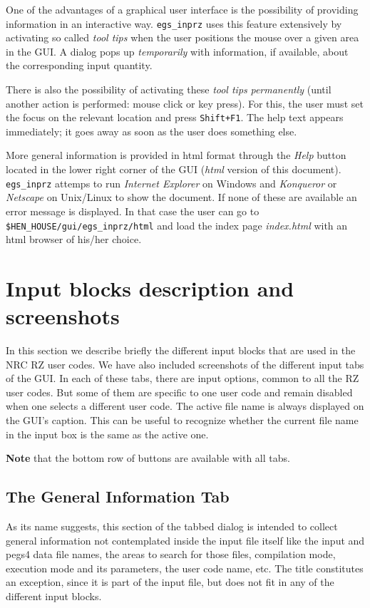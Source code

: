 \documentclass[12pt,twoside]{article}   %
\begin{document}
One of the advantages of a graphical user interface is the possibility of providing 
information in an interactive way. {\tt egs\_inprz} uses this feature extensively by 
activating so called {\em tool tips} when the user positions the mouse over a given area
in the GUI. A dialog pops up {\em temporarily} with information, if available, about the 
corresponding input quantity. 

There is also the possibility of activating these {\em tool tips} {\em permanently} (until 
another action is performed: mouse click or key press). For this, the user must set the focus 
on the relevant location and press {\tt Shift+F1}. The help text appears immediately; it goes 
away as soon as the user does something else.

More general information is provided in html format through the {\em Help} button located 
in the lower right corner of the GUI ({\em html} version of this document).
{\tt egs\_inprz} attemps to run {\em Internet Explorer} on Windows and
{\em Konqueror} or {\em Netscape} on Unix/Linux to show the document. If none of these 
are available an error message is displayed. In that case the user can go to {\tt \$HEN\_HOUSE/gui/egs\_inprz/html} and load the index page {\em index.html} with an html 
browser of his/her choice.

\section{Input blocks description and screenshots}
\label{screenshots}

In this section we describe briefly the different input blocks that are used in the NRC 
RZ user codes.
We have also included screenshots of the different input tabs of the GUI. In each 
of these tabs, there are input options, common to all the RZ user codes. But some of them are
specific to one user code and remain disabled when one selects a different user code.
The active file name is always displayed on the GUI's caption. This can be useful to recognize
whether the current file name in the input box is the same as the active one.

{\bf Note} that the bottom row of buttons are available with all tabs.


\newpage
\subsection{The General Information Tab}
\label{general}

As its name suggests, this section of the tabbed dialog is intended to collect general 
information not contemplated inside the input file itself like the input and pegs4 data 
file names, the areas to search for those files, compilation mode, execution mode and 
its parameters, 
the user code name, etc. The title constitutes an exception, since it is part of the input 
file, but does not fit in any of the different input blocks.
\end{document}
